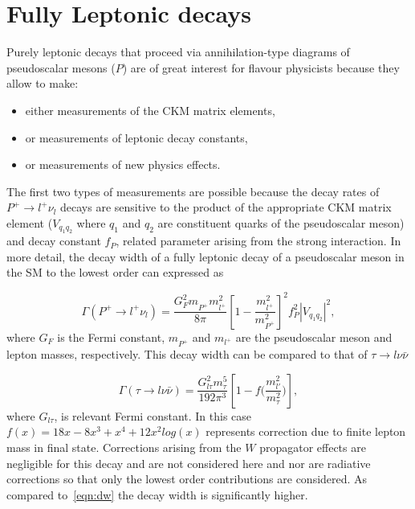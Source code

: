 \section{Fully Leptonic  decays}
\label{lnudecays}
Purely leptonic decays that proceed via annihilation-type diagrams of pseudoscalar mesons ($P$) are of great interest for flavour physicists because they allow to make:
\begin{itemize}
\item either measurements of the \gls{CKM} matrix elements,
\item or measurements of leptonic decay constants,
\item or measurements of new physics effects.
\end{itemize}

The first two types of measurements are possible because the decay rates of $P^{+}\rightarrow l^{+} \nu_{l}$ decays are sensitive to the product of the appropriate \gls{CKM} matrix element ($V_{q_{1}q_{2}}$ where $q_{1}$ and $q_{2}$ are constituent quarks of the pseudoscalar meson) and decay constant $f_{P}$, related parameter arising from the strong interaction. In more detail, the decay width of a fully leptonic decay of a pseudoscalar meson in the \gls{SM} to the lowest order can expressed as 

\begin{equation}
\Gamma(P^{+} \rightarrow {l^{+}} \nu_{l})=  
	\frac{G_{F}^{2} m^{}_{P^{+}}  m_{l^{+}}^{2}}{8\pi} 
	\left[1 - \frac{m_{l^{+}}^{2}}{m_{P^{+}}^{2}}\right]^{2}  
	f_{P}^{2} |V_{q_{1}q_{2}}|^{2} 
	,
\label{eqn:dw} 
\end{equation}
where
$G_F$ is the Fermi constant,
$m^{}_{P^{+}}$ and $m_{l^{+}}$ are the pseudoscalar meson and lepton masses, respectively. This decay width can be compared to that of $\tau \rightarrow l\nu \bar{\nu}$\cite{Marciano:1988vm}


\begin{equation}
\Gamma(\tau \rightarrow {l} \nu \bar{\nu})=
	\frac{G^{2}_{l\tau} m^{5}_{\tau}}{192\pi^{3}}\left[1-f\big(\frac{m^{2}_{l'}}{{m^{2}_{\tau}}}\big)\right],
\label{eqn:tauonic} 
\end{equation}
where $G_{l\tau}$, is relevant Fermi constant. In this case $ f(x) = 1  8x - 8x^{3} + x^{4} + 12x^{2}log(x)$ represents correction due to finite lepton mass in final state. Corrections arising from the $W$ propagator effects are negligible for this decay and are not considered here and nor are radiative corrections so that only the lowest order contributions are considered. As compared to~\autoref{eqn:dw} the decay width is significantly higher. 

